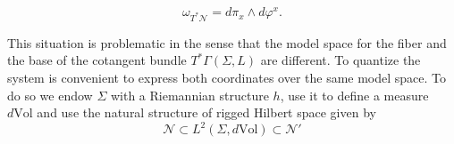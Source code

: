 \documentclass[12pt]{article}%
\begin{document}
\begin{equation}
\label{eq:symplecticForm}
\omega_{T^*\mathcal{N}}=  d\pi_x \wedge d\varphi^x.
\end{equation}

This situation is problematic in the sense that the model space for the fiber and the base of the cotangent bundle $T^*\Gamma(\Sigma,L)$ are different. To quantize the system is convenient to express both coordinates over the same model space. To do so we endow $\Sigma$ with a Riemannian structure $h$, use it to define a measure $d\mathrm{Vol}$ and use the natural structure of rigged Hilbert space given by 
\begin{equation}
\label{eq:rhsOnSigma}
\mathcal{N}\subset L^2(\Sigma,d\textrm{Vol})\subset \mathcal{N}'
\end{equation} 
\end{document}
